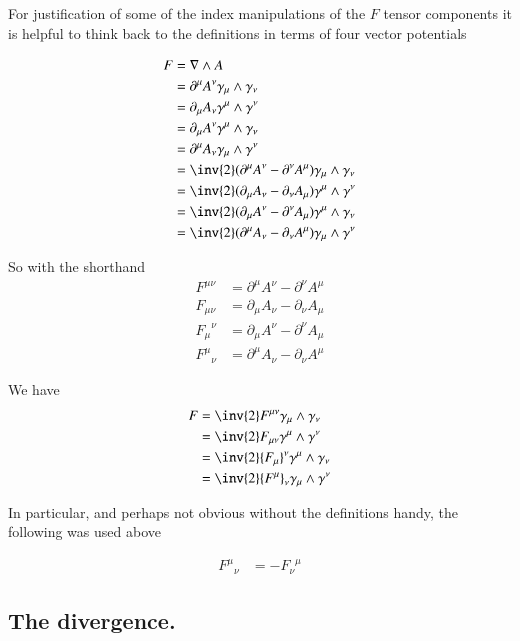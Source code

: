 \documentclass{article}
\begin{document}
For justification of some of the 
index manipulations of the $F$ tensor components it is 
helpful to think back to the definitions in terms of four vector potentials

\begin{align*}
F &= \grad \wedge A \\
&= \partial^\mu A^\nu \gamma_\mu \wedge \gamma_\nu \\
&= \partial_\mu A_\nu \gamma^\mu \wedge \gamma^\nu \\
&= \partial_\mu A^\nu \gamma^\mu \wedge \gamma_\nu \\ 
&= \partial^\mu A_\nu \gamma_\mu \wedge \gamma^\nu \\
&= \inv{2}(\partial^\mu A^\nu -\partial^\nu A^\mu ) \gamma_\mu \wedge \gamma_\nu \\
&= \inv{2}(\partial_\mu A_\nu -\partial_\nu A_\mu ) \gamma^\mu \wedge \gamma^\nu \\
&= \inv{2}(\partial_\mu A^\nu -\partial^\nu A_\mu ) \gamma^\mu \wedge \gamma_\nu \\ 
&= \inv{2}(\partial^\mu A_\nu -\partial_\nu A^\mu ) \gamma_\mu \wedge \gamma^\nu
\end{align*}

So with the shorthand
\begin{align*}
F^{\mu\nu} &= \partial^\mu A^\nu -\partial^\nu A^\mu \\
F_{\mu\nu} &= \partial_\mu A_\nu -\partial_\nu A_\mu \\
{F_{\mu}}^{\nu} &= \partial_\mu A^\nu -\partial^\nu A_\mu \\
{F^{\mu}}_{\nu} &= \partial^\mu A_\nu -\partial_\nu A^\mu
\end{align*}

We have
\begin{align*}
F 
&= \inv{2}F^{\mu\nu} \gamma_\mu \wedge \gamma_\nu \\
&= \inv{2}F_{\mu\nu} \gamma^\mu \wedge \gamma^\nu \\
&= \inv{2}{F_\mu}^\nu \gamma^\mu \wedge \gamma_\nu \\ 
&= \inv{2}{F^\mu}_\nu \gamma_\mu \wedge \gamma^\nu
\end{align*}

In particular, and perhaps not obvious without the definitions handy, the following was used above

\begin{align*}
{F^{\mu}}_{\nu} &= -{F_{\nu}}^{\mu}
\end{align*}

\subsection{ The divergence. }
\end{document}
